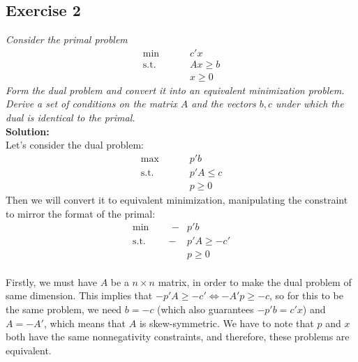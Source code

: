 \documentclass[12pt]{article}
\begin{document}
\subsection*{Exercise 2}
\textit{Consider the primal problem} \\
\begin{align*}
\text{min } \qquad & c' x \\
\text{s.t. } \qquad  & Ax \geqslant b \\
							& x \geqslant 0
\end{align*}
\textit{Form the dual problem and convert it into an equivalent minimization problem. Derive a set of conditions on the matrix $A$ and the vectors $b,c$ under which the dual is identical to the primal.}
\\
\textbf{Solution:} \\  
Let's consider the dual problem: \\
\begin{align*}
\text{max } \qquad & p' b \\
\text{s.t. } \qquad  & p'A \leqslant c \\
							& p \geqslant 0
\end{align*}
Then we will convert it to equivalent minimization, manipulating the constraint to mirror the format of the primal: 
\begin{align*}
\text{min } \qquad  -&p' b \\
\text{s.t. } \qquad  -&p'A \geqslant -c' \\
							& p \geqslant 0
\end{align*}
\\
Firstly, we must have $A$ be a $n \times n$ matrix, in order to make the dual problem of same dimension. This implies that $-p'A \geqslant -c' \Leftrightarrow -A'p \geqslant -c$, so for this to be the same problem, we need $b = -c$ (which also guarantees $-p'b = c'x$) and $A = -A'$, which means that $A$ is skew-symmetric. We have to note that $p$ and $x$ both have the same nonnegativity constraints, and therefore, these problems are equivalent.


\newpage

\end{document}
